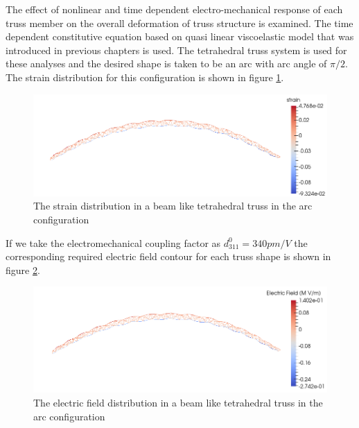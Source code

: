 The effect of nonlinear and time dependent electro-mechanical response of each truss member on the overall deformation of truss structure is examined.
The time dependent constitutive equation based on quasi linear viscoelastic model that was introduced in previous chapters is used.
The tetrahedral truss system is used for these analyses and the desired shape is taken to be an arc with arc angle of $\pi/2$.
The strain distribution for this configuration is shown in figure \ref{fig:linear_tetrahedral_bending_strain_contour}.
\begin{figure} 
\centering
\includegraphics[width=5.0in]{./chap_5_active_trusses/images_non_linear_time_dependent_constitutive_equatio/linear_tetrahedral_bending_strain_contour.png}
\caption{The strain distribution in a beam like tetrahedral truss in the arc configuration}
\label{fig:linear_tetrahedral_bending_strain_contour}
\end{figure} 
If we take the electromechanical coupling factor as $d_{311}^0=340pm/V$ the corresponding required electric field contour for each truss shape is shown in figure \ref{fig:linear_tetrahedral_bending_efield_contour}.

\begin{figure} 
\centering
\includegraphics[width=5.0in]{./chap_5_active_trusses/images_non_linear_time_dependent_constitutive_equatio/linear_tetrahedral_bending_electric_field_contour.png}
\caption{The electric field distribution in a beam like tetrahedral truss in the arc configuration}
\label{fig:linear_tetrahedral_bending_efield_contour}
\end{figure} 

